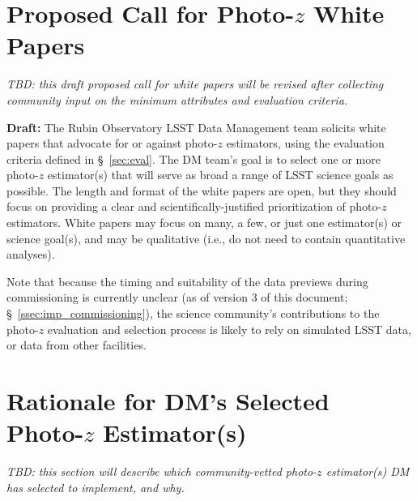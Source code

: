 \documentclass[DM,lsstdraft,toc]{lsstdoc}
\begin{document}
\clearpage
\section{Proposed Call for Photo-$z$ White Papers} \label{sec:wp}

\textit{TBD: this draft proposed call for white papers will be revised after collecting community input on the minimum attributes and evaluation criteria.}

\textbf{Draft:} The Rubin Observatory LSST Data Management team solicits white papers that advocate for or against photo-$z$ estimators, using the evaluation criteria defined in \S~\ref{sec:eval}.
The DM team's goal is to select one or more photo-$z$ estimator(s) that will serve as broad a range of LSST science goals as possible. 
The length and format of the white papers are open, but they should focus on providing a clear and scientifically-justified prioritization of photo-$z$ estimators.
White papers may focus on many, a few, or just one estimator(s) or science goal(s), and may be qualitative (i.e., do not need to contain quantitative analyses). 

Note that because the timing and suitability of the data previews during commissioning is currently unclear (as of version 3 of this document; \S~\ref{ssec:imp_commissioning}), the science community's contributions to the photo-$z$ evaluation and selection process is likely to rely on simulated LSST data, or data from other facilities.

\clearpage
\section{Rationale for DM's Selected Photo-$z$ Estimator(s)} \label{sec:choice}

\textit{TBD: this section will describe which community-vetted photo-$z$ estimator(s) DM has selected to implement, and why.}



\clearpage



\clearpage
\appendix 
\end{document}

